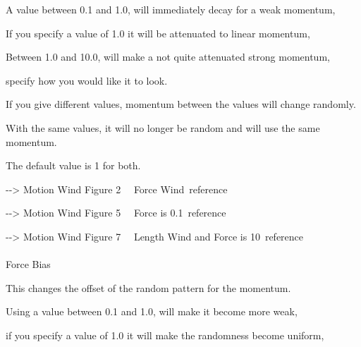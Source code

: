 \documentclass[a4paper,12pt]{article}
\begin{document}
A value between 0.1 and 1.0, will immediately decay for a weak momentum,\par
If you specify a value of 1.0 it will be attenuated to linear momentum,\par
Between 1.0 and 10.0, will make a not quite attenuated strong momentum,\par
specify how you would like it to look.\par
If you give different values, momentum between the values will change randomly.\par
With the same values, it will no longer be random and will use the same momentum.\par
The default value is 1 for both.\par
-{-}> \textquotedbl Motion Wind Figure 2 \ \ Force Wind\textquotedbl \ reference\par
-{-}> \textquotedbl Motion Wind Figure 5 \ \ Force is 0.1\textquotedbl \ reference\par
-{-}> \textquotedbl Motion Wind Figure 7 \ \ Length Wind and Force is 10\textquotedbl \ reference\\
\\
Force Bias\par
This changes the offset of the random pattern for the momentum.\par
Using a value between 0.1 and 1.0, will make it become more weak,\par
if you specify a value of 1.0 it will make the randomness become uniform,

\newpage

\thispagestyle{empty}
\end{document}
